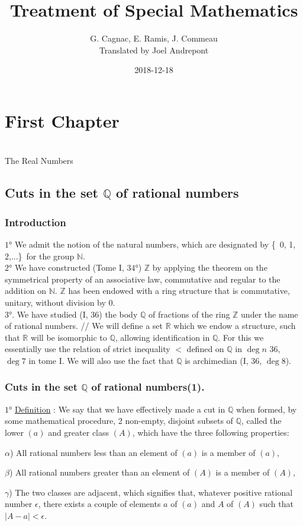 \documentclass{article}
\title{Treatment of Special Mathematics}
\date{2018-12-18}
\author{G. Cagnac, E. Ramis, J. Commeau \\Translated by Joel Andrepont}
\begin{document}
	\maketitle
	\newpage
	 
	\chapter{First Chapter} 
	{\LARGE \\ The Real Numbers}
	\section{Cuts in the set $\mathbb{Q}$ of rational numbers}
	\subsection{\textbf{Introduction}}
	
	$\ang{1}$ We admit the notion of the natural numbers, which are designated by \{\ 0, 1, 2,...\}\ for the group $\mathbb{N}$. \\
	$\ang{2}$ We have constructed (Tome I, $\ang{34}$) $\mathbb{Z}$ by applying the theorem on the symmetrical property of an associative law, commutative and regular to the addition on $\mathbb{N}$. $\mathbb{Z}$ has been endowed with a ring structure that is commutative, unitary, without division by 0. \\
	$\ang{3}$. We have studied (I, 36) the body $\mathbb{Q}$ of fractions of the ring $\mathbb{Z}$ under the name of rational numbers. 
	// We will define a set $\mathbb{R}$ which we endow a structure, such that $\mathbb{R}$ will be isomorphic to $\mathbb{Q}$, allowing identification in $\mathbb{Q}$. For this we essentially use the relation of strict inequality $<$ defined on $\mathbb{Q}$ in $\deg{n}$ 36, $\deg{7}$ in tome I. We will also use the fact that $\mathbb{Q}$ is archimedian (I, 36, $\deg{8}$).
	
	
	\subsection{\textbf{Cuts in the set $\mathbb{Q}$ of rational numbers(1).}}
	$\ang{1}$ \underline{Definition} :  We say that we have effectively made a cut in $\mathbb{Q}$ when formed, by some mathematical procedure, 2 non-empty, disjoint subsets of $\mathbb{Q}$, called the lower $(a)$ and greater class $(A)$, which have the three following properties: 
	\\
	\begin{list}{}{}
		\item $\alpha$) All rational numbers less than an element of $(a)$ is a member of $(a)$,
		\item $\beta$) All rational numbers greater than an element of $(A)$ is a member of  $(A)$,
		\item{ $\gamma$) The two classes are adjacent, which signifies that, whatever positive
		 rational number $\epsilon$, there exists a couple of elements $a$ of $(a)$ and $A$ of $(A)$ such that $ |A - a| < \epsilon$.} 
	\end{list}
	
\end{document}
